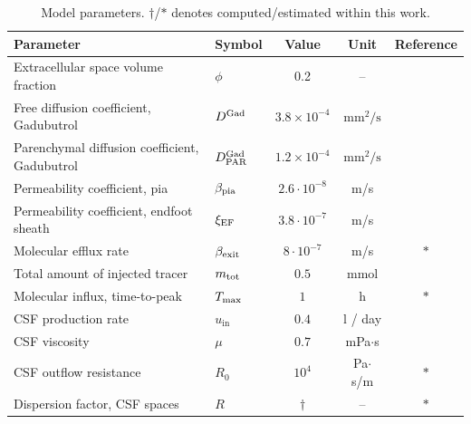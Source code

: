 \documentclass[fleqn,10pt]{wlscirep}
\begin{document}
\begin{table}
  \begin{center}
    \begin{tabular}{ll|ccc}
      \toprule
      Parameter& Symbol & Value & Unit& Reference\\
      \midrule
      Extracellular space volume fraction & $\phi$ & 0.2 & -- & \cite{nicholson1981ion} \\
      Free diffusion coefficient, Gadubutrol & $D^{\rm Gad}$ & $3.8 \times 10^{-4}$& $\text{mm}^2/\text{s}$ & \cite{valnes2020apparent}\\
      Parenchymal diffusion coefficient, Gadubutrol & $D^{\rm Gad}_{\rm PAR}$ & $1.2 \times 10^{-4}$ & $\text{mm}^2/\text{s}$  & \cite{hornkjol2022csf} \\
      Permeability coefficient, pia & $\beta_{\rm pia}$ & $2.6 \cdot 10^{-8}$ & m/s & \cite{riseth2025twocompartment} \\
      Permeability coefficient, endfoot sheath & $\xi_{\rm EF}$ & $3.8\cdot 10^{-7}$  & m/s & \cite{koch2023estimates} \\
      Molecular efflux rate & $\beta_{\rm exit}$ & $8\cdot 10^{-7}$ & m/s & $\ast$ \\
      Total amount of injected tracer & $m_{\rm tot}$ & $0.5$ & mmol & \cite{eide2024functional} \\
      Molecular influx, time-to-peak & $T_{\rm max}$ & $1$ & h & $\ast$ \\
      CSF production rate & $u_{\mathrm{in}}$ & $0.4$  & l / day & \cite{nilsson1992circadian} \\
      CSF viscosity & $\mu$ & $0.7$ & mPa$ \cdot $s & \cite{bloomfield1998effects} \\ 
      CSF outflow resistance & $R_0$ & $10^{4}$  & Pa$\cdot$s/m & $\ast$ \\ 
      Dispersion factor, CSF spaces & $R$ & $\dagger$ & -- & $\ast$ \\
      \bottomrule
    \end{tabular}
  \end{center}
  \caption{Model parameters. $\dagger$/$\ast$ denotes computed/estimated within this work.}
  \label{tab:parameters}
\end{table}
\end{document}
